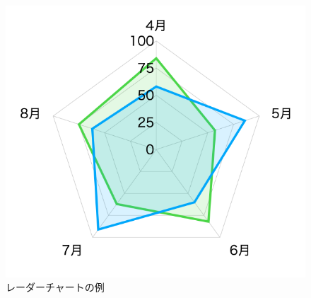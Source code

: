 \begin{figure}[H]
  \centering
  \includegraphics[width=.4\linewidth]{./fig/chart3.png}
  \caption{レーダーチャートの例}
  \label{fig:chart3}
\end{figure}

